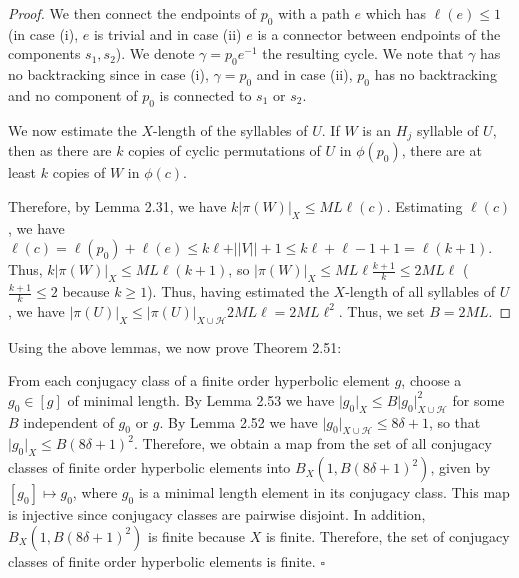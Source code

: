 \documentclass[12pt]{article}
\newcommand{\vs}{\vskip10pt}
\begin{document}
\begin{proof}
		\vs
		
		We then connect the endpoints of $p_0$ with a path $e$ which has $\ell(e) \leq 1$ (in case (i), $e$ is trivial and in case (ii) $e$ is a connector between endpoints of the components $s_1, s_2$). We denote $\gamma = p_0 e^{-1}$ the resulting cycle. We note that $\gamma$ has no backtracking since in case (i), $\gamma = p_0$ and in case (ii), $p_0$ has no backtracking and no component of $p_0$ is connected to $s_1$ or $s_2$. 
		
		\vs 
		
		We now estimate the $X$-length of the syllables of $U$. If $W$ is an $H_j$ syllable of $U$, then as there are $k$ copies of cyclic permutations of $U$ in $\phi(p_0)$, there are at least $k$ copies of $W$ in $\phi(c)$. 
		
		\vs 
		
		Therefore, by Lemma 2.31, we have $k \vert \pi(W) \vert_X \leq ML \ell (c)$. Estimating $\ell(c)$, we have $\ell(c) = \ell(p_0) + \ell(e) \leq k \ell + \vert \vert V \vert \vert + 1 \leq k \ell + \ell - 1 + 1 = \ell (k+1)$. Thus, $k \vert \pi(W) \vert_X \leq ML \ell (k+1)$, so $\vert \pi(W) \vert_X \leq ML \ell \frac{k + 1}{k} \leq 2ML \ell$ ($\frac{k+1}{k} \leq 2$ because $k \geq 1$). Thus, having estimated the $X$-length of all syllables of $U$, we have $\vert \pi(U) \vert_X \leq \vert \pi(U) \vert_{X \cup \mathcal{H}} 2ML \ell = 2 ML \ell^2$. Thus, we set $B = 2ML$.
		
	\end{proof}

	Using the above lemmas, we now prove Theorem 2.51: 
	
	\vs 
	
	From each conjugacy class of a finite order hyperbolic element $g$, choose a $g_0 \in [g]$ of minimal length. By Lemma 2.53 we have $\vert g_0 \vert_X \leq B \vert g_0 \vert_{X \cup \mathcal{H}}^2$ for some $B$ independent of $g_0$ or $g$. By Lemma 2.52 we have $\vert g_0 \vert_{X \cup \mathcal{H}} \leq 8 \delta + 1$, so that $\vert g_0 \vert_X \leq B(8 \delta + 1)^2$. Therefore, we obtain a map from the set of all conjugacy classes of finite order hyperbolic elements into $B_X(1, B(8 \delta + 1)^2)$, given by $[g_0] \mapsto g_0$, where $g_0$ is a minimal length element in its conjugacy class. This map is injective since conjugacy classes are pairwise disjoint. In addition, $B_X(1, B(8 \delta + 1)^2)$ is finite because $X$ is finite. Therefore, the set of conjugacy classes of finite order hyperbolic elements is finite. $\square$
	
\end{document}
